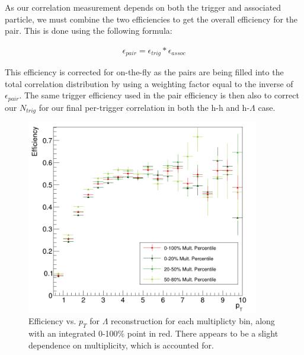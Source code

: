 \documentclass[ALICE,manyauthors]{ALICE_analysis_notes}
\begin{document}
As our correlation measurement depends on both the trigger and associated particle, we must combine the two efficiencies to get the overall efficiency for the pair.  This is done using the following formula:

\begin{align*}
    \epsilon_{pair} = \epsilon_{trig}*\epsilon_{assoc}
\end{align*}

This efficiency is corrected for on-the-fly as the pairs are being filled into the total correlation distribution by using a weighting factor equal to the inverse of $\epsilon_{pair}$. The same trigger efficiency used in the pair efficiency is then also to correct our $N_{trig}$ for our final per-trigger correlation in both the h-h and h-$\Lambda$ case.


\begin{figure}[ht]
\centering
\includegraphics[width=4in]{figures/v0_efficiency_pt.png}
\caption{Efficiency vs. $p_T$ for $\Lambda$ reconstruction for each multiplicty bin, along with an integrated 0-100\% point in red. There appears to be a slight dependence on multiplicity, which is accounted for.}
\label{lambda_eff_pt}
\end{figure}
\end{document}
